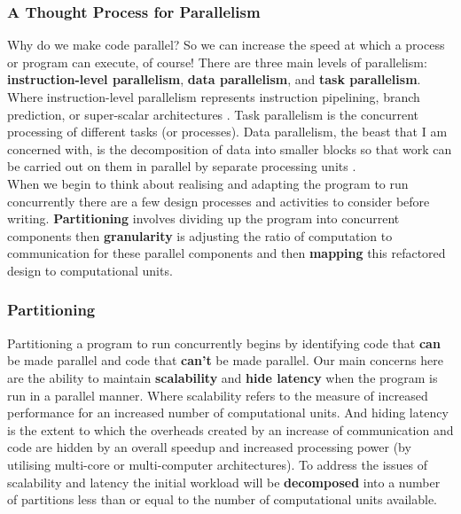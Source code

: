 \documentclass[11pt]{article} %
\begin{document}
\subsubsection{A Thought Process for Parallelism}
Why do we make code parallel? So we can increase the speed at which a process or program can execute, of course! There are three main levels of parallelism: {\bf instruction-level parallelism}, {\bf data parallelism}, and {\bf task parallelism}. Where instruction-level parallelism represents instruction pipelining, branch prediction, or super-scalar architectures \cite[Patterson, Hennessy, p41]{ref10}. Task parallelism is the concurrent processing of different tasks (or processes). Data parallelism, the beast that I am concerned with, is the decomposition of data into smaller blocks so that work can be carried out on them in parallel by separate processing units \cite[Patterson, Hennessy, A-17]{ref10}.\\

When we begin to think about realising and adapting the program to run concurrently there are a few design processes and activities to consider before writing. {\bf Partitioning} involves dividing up the program into concurrent components then {\bf granularity} is adjusting the ratio of computation to communication for these parallel components and then {\bf mapping} this refactored design to computational units. \cite[p77,78]{ref9}
\subsubsection*{Partitioning}
Partitioning a program to run concurrently begins by identifying code that {\bf can} be made parallel and code that {\bf can't} be made parallel. Our main concerns here are the ability to maintain {\bf scalability} and {\bf hide latency} when the program is run in a parallel manner. Where scalability refers to the measure of increased performance for an increased number of computational units. And hiding latency is the extent to which the overheads created by an increase of communication and code are hidden by an overall speedup and increased processing power (by utilising multi-core or multi-computer architectures). \cite[p78,79]{ref9} To address the issues of scalability and latency the initial workload will be {\bf decomposed} into a number of partitions less than or equal to the number of computational units available.\\
\end{document}
